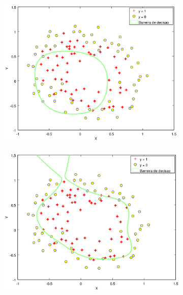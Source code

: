 \begin{figure}
  
  \caption{Exemplo de \textit{underfitting} e \textit{overfitting}} \label{fig:exemplounderover}
  
  \begin{subfigure}[htb]{0.5\textwidth}
    \includegraphics[width=\textwidth]{img/underfittingex}
  \end{subfigure}
  \begin{subfigure}[htb]{0.5\textwidth}
    \includegraphics[width=\textwidth]{img/overfittingex}
  \end{subfigure}

\end{figure}

